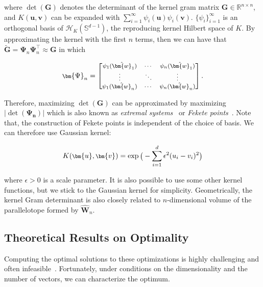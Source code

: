 where $\det(\bm{G})$ denotes the determinant of the kernel gram matrix $\bm{G}\in\mathbb{R}^{n\times n}$, and $K(\bm{u},\bm{v})$ can be expanded with $\sum_{i=1}^\infty\psi_i(\bm{u})\psi_i(\bm{v})$. $\{\psi_i\}_{i=1}^\infty$ is an orthogonal basis of $\mathcal{H}_K(\mathbb{S}^{d-1})$, the reproducing kernel Hilbert space of $K$. By approximating the kernel with the first $n$ terms, then we can have that $\tilde{\bm{G}}=\bm{\Psi}_n\bm{\Psi}_n^\top\approx\bm{G}$ in which

\begin{equation}
\footnotesize
    \bm{\Psi}_n=\begin{bmatrix}
    \psi_1(\hat{\bm{w}}_1)&\cdots&\psi_n(\hat{\bm{w}}_1)\\
    \vdots & \ddots & \vdots\\
    \psi_1(\hat{\bm{w}}_n)&\cdots&\psi_n(\hat{\bm{w}}_n)\\
    \end{bmatrix}.
\end{equation}

Therefore, maximizing $\det(\bm{G})$ can be approximated by maximizing $|\det(\bm{\Psi_n})|$ which is also known as \emph{extremal systems}~\cite{sloan2004extremal} or \emph{Fekete points}~\cite{marzo2010equidistribution,berman2011fekete,karvonen2020kernel}. Note that, the construction of Fekete points is independent of the choice of basis. We can therefore use Gaussian kernel:

\begin{equation}
\footnotesize
    K(\bm{u},\bm{v})=\exp\big( -\sum_{i=1}^d\epsilon^2(u_i-v_i)^2 \big)
\end{equation}

where $\epsilon>0$ is a scale parameter. It is also possible to use some other kernel functions, but we stick to the Gaussian kernel for simplicity. Geometrically, the kernel Gram determinant is also closely related to $n$-dimensional volume of the parallelotope formed by $\hat{\bm{W}}_n$.

\subsection{Theoretical Results on Optimality}\label{optimality}

Computing the optimal solutions to these optimizations is highly challenging and often infeasible~\cite{borodachov2019discrete}. Fortunately, under conditions on the dimensionality and the number of vectors, we can characterize the optimum.

